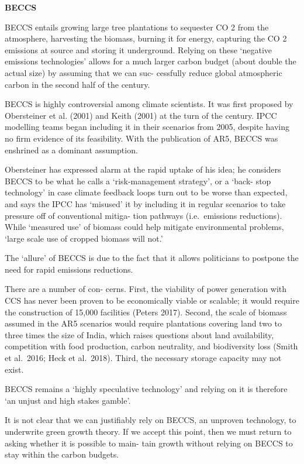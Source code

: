 \documentclass[
]{book}
\begin{document}
\textbf{BECCS}

BECCS entails growing large tree plantations to
sequester CO 2 from the atmosphere, harvesting the biomass, burning it for energy, capturing the CO 2
emissions at source and storing it underground. Relying on these `negative emissions technologies'
allows for a much larger carbon budget (about double the actual size) by assuming that we can suc-
cessfully reduce global atmospheric carbon in the second half of the century.

BECCS is highly controversial among climate scientists. It was first proposed by Obersteiner et al.
(2001) and Keith (2001) at the turn of the century. IPCC modelling teams began including it in their
scenarios from 2005, despite having no firm evidence of its feasibility. With the publication of AR5,
BECCS was enshrined as a dominant assumption.

Obersteiner has expressed alarm at the rapid
uptake of his idea; he considers BECCS to be what he calls a `risk-management strategy', or a `back-
stop technology' in case climate feedback loops turn out to be worse than expected, and says the
IPCC has `misused' it by including it in regular scenarios to take pressure off of conventional mitiga-
tion pathways (i.e.~emissions reductions).
While `measured use' of biomass could help mitigate environmental problems,
`large scale use of cropped biomass will not.'

The `allure' of BECCS is due to the fact that it allows
politicians to postpone the need for rapid emissions reductions.

There are a number of con-
cerns. First, the viability of power generation with CCS has never been proven to be economically
viable or scalable; it would require the construction of 15,000 facilities (Peters 2017). Second, the
scale of biomass assumed in the AR5 scenarios would require plantations covering land two to
three times the size of India, which raises questions about land availability, competition with food
production, carbon neutrality, and biodiversity loss (Smith et al.~2016; Heck et al.~2018). Third, the
necessary storage capacity may not exist.

BECCS remains a `highly speculative technology'
and relying on it is therefore `an unjust and high stakes gamble'.

It is not clear that we can justifiably rely on BECCS, an unproven technology, to underwrite green
growth theory. If we accept this point, then we must return to asking whether it is possible to main-
tain growth without relying on BECCS to stay within the carbon budgets.
\end{document}
